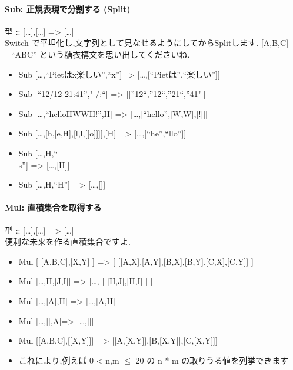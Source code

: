 \paragraph{Sub: 正規表現で分割する (Split)}

型 :: {[}\ldots{}{]},{[}\ldots{}{]} =\textgreater{}
{[}\ldots{}{]}\\Switch
で平坦化し,文字列として見なせるようにしてからSplitします. {[}A,B,C{]}
=``ABC'' という糖衣構文を思い出してくださいね.

\begin{itemize}
\item
  Sub {[}\ldots{},``Pietはx楽しい'',``x''{]}=\textgreater{}
  {[}\ldots{},{[}``Pietは'',``楽しい''{]}{]}
\item
  Sub {[}``12/12 21:41''," \textbar{}/\textbar{}:``{]} =\textgreater{}
  {[}{[}''12``,''12``,''21``,''41"{]}{]}
\item
  Sub {[}\ldots{},``helloHWWH!'',H{]} =\textgreater{}
  {[}\ldots{},{[}``hello'',{[}W,W{]},{[}!{]}{]}{]}
\item
  Sub {[}\ldots{},{[}h,{[}e,H{]},{[}l,l,{[}{[}o{]}{]}{]}{]},{[}H{]}
  =\textgreater{} {[}\ldots{},{[}``he'',``llo''{]}{]}
\item
  Sub {[}\ldots{},H,``\\s''{]} =\textgreater{} {[}\ldots{},{[}H{]}{]}
\item
  Sub {[}\ldots{},H,``H''{]} =\textgreater{} {[}\ldots{},{[}{]}{]}
\end{itemize}

\paragraph{Mul: 直積集合を取得する}

型 :: {[}\ldots{}{]},{[}\ldots{}{]} =\textgreater{}
{[}\ldots{}{]}\\便利な未来を作る直積集合ですよ.

\begin{itemize}
\item
  Mul {[} {[}A,B,C{]},{[}X,Y{]} {]} =\textgreater{} {[}
  {[}{[}A,X{]},{[}A,Y{]},{[}B,X{]},{[}B,Y{]},{[}C,X{]},{[}C,Y{]}{]} {]}
\item
  Mul {[}\ldots{},H,{[}J,I{]}{]} =\textgreater{} {[}\ldots{}, {[}
  {[}H,J{]},{[}H,I{]} {]} {]}
\item
  Mul {[}\ldots{},{[}A{]},H{]} =\textgreater{} {[}\ldots{},{[}A,H{]}{]}
\item
  Mul {[}\ldots{},{[}{]},A{]}=\textgreater{} {[}\ldots{},{[}{]}{]}
\item
  Mul {[}{[}A,B,C{]},{[}{[}X,Y{]}{]}{]} =\textgreater{}
  {[}{[}A,{[}X,Y{]}{]},{[}B,{[}X,Y{]}{]},{[}C,{[}X,Y{]}{]}{]}
\item
  これにより,例えば 0 \textless{} n,m $\leq$ 20 の n * m
  の取りうる値を列挙できます
\end{itemize}

